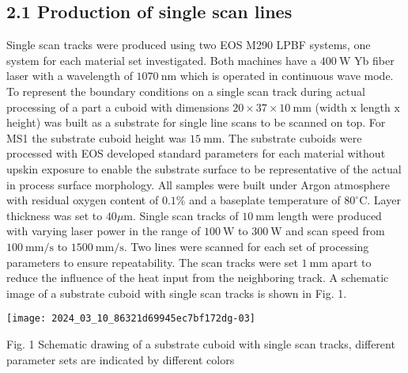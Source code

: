 \documentclass[10pt]{article}
\begin{document}
\subsection*{2.1 Production of single scan lines}
Single scan tracks were produced using two EOS M290 LPBF systems, one system for each material set investigated. Both machines have a $400 \mathrm{~W}$ Yb fiber laser with a wavelength of $1070 \mathrm{~nm}$ which is operated in continuous wave mode. To represent the boundary conditions on a single scan track during actual processing of a part a cuboid with dimensions $20 \times 37 \times 10 \mathrm{~mm}$ (width $\mathrm{x}$ length $\mathrm{x}$ height) was built as a substrate for single line scans to be scanned on top. For MS1 the substrate cuboid height was $15 \mathrm{~mm}$. The substrate cuboids were processed with EOS developed standard parameters for each material without upskin exposure to enable the substrate surface to be representative of the actual in process surface morphology. All samples were built under Argon atmosphere with residual oxygen content of $0.1 \%$ and a baseplate temperature of $80^{\circ} \mathrm{C}$. Layer thickness was set to $40 \mu \mathrm{m}$. Single scan tracks of $10 \mathrm{~mm}$ length were produced with varying laser power in the range of $100 \mathrm{~W}$ to $300 \mathrm{~W}$ and scan speed from $100 \mathrm{~mm} / \mathrm{s}$ to $1500 \mathrm{~mm} / \mathrm{s}$. Two lines were scanned for each set of processing parameters to ensure repeatability. The scan tracks were set $1 \mathrm{~mm}$ apart to reduce the influence of the heat input from the neighboring track. A schematic image of a substrate cuboid with single scan tracks is shown in Fig. 1.

\begin{center}
\texttt{[image: 2024\_03\_10\_86321d69945ec7bf172dg-03]}
\end{center}

Fig. 1 Schematic drawing of a substrate cuboid with single scan tracks, different parameter sets are indicated by different colors
\end{document}
